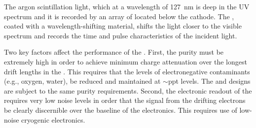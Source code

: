The argon scintillation light, which at a wavelength of  \SI{127}{nm} is deep in the UV spectrum and it is recorded by an array of  located below the cathode.  %
The , coated with a wavelength-shifting material, shifts the light  closer to the visible spectrum and records the time and pulse characteristics of the incident light.


Two key factors affect the performance of the  \lartpc{}.  First, the \lar purity must be extremely high in order to achieve minimum charge attenuation over the longest drift lengths in the \lartpc{}.  This requires that the levels of electronegative contaminants (e.g., oxygen, water), be reduced and
maintained at $\sim$ppt levels.  The \dual and \single designs are subject to the same purity requirements. 
%
Second, the electronic readout
of the \lartpc{} requires very low noise levels in order that the signal from the drifting electrons
be clearly discernible over the baseline of the electronics.  This requires use of low-noise cryogenic electronics. 

